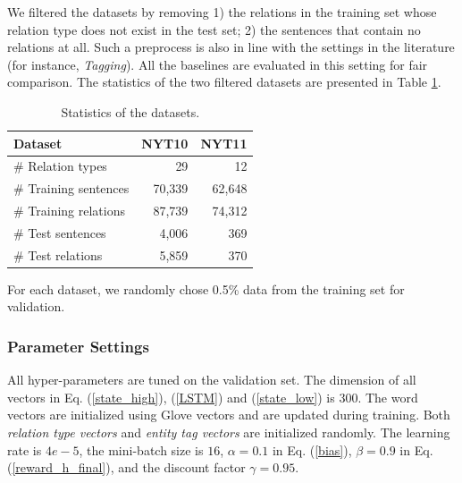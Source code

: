 \documentclass[letterpaper]{article} %
\theoremstyle{definition}
\begin{document}
We filtered the datasets by removing 1) the relations in the training set whose relation type does not exist in the test set; 2) the sentences that contain no relations at all. Such a preprocess is also in line with the settings in the literature (for instance, \textit{Tagging}). All the baselines are evaluated in this setting for fair comparison. The statistics of the two filtered datasets are presented in Table \ref{datasets}.

\begin{table}[!htb]
    \centering
    \begin{tabular}{lrr}%
    \toprule
        Dataset & NYT10 & NYT11 \\%
    \midrule
        \# Relation types & 29 & 12 \\%
        \# Training sentences & 70,339 & 62,648 \\%
        \# Training relations & 87,739 & 74,312 \\%
        \# Test sentences & 4,006 & 369 \\%
        \# Test relations & 5,859 & 370 \\%
    \bottomrule
    \end{tabular}
    \caption{Statistics of the datasets.}
    \label{datasets}
\end{table}

For each dataset, we randomly chose 0.5\% data from the training set for validation.

%
\subsubsection{Parameter Settings}
All hyper-parameters are tuned on the validation set. The dimension of all vectors in Eq. (\ref{state_high}), (\ref{LSTM}) and (\ref{state_low}) is $300$. The word vectors are initialized using Glove vectors \cite{pennington2014glove} and are updated during training. Both \textit{relation type vectors} and \textit{entity tag vectors} are initialized randomly. %
The learning rate is $4e-5$, the mini-batch size is $16$, $\alpha = 0.1$ in Eq. (\ref{bias}), $\beta = 0.9$ in Eq. (\ref{reward_h_final}), and the discount factor $\gamma = 0.95$.
\end{document}
